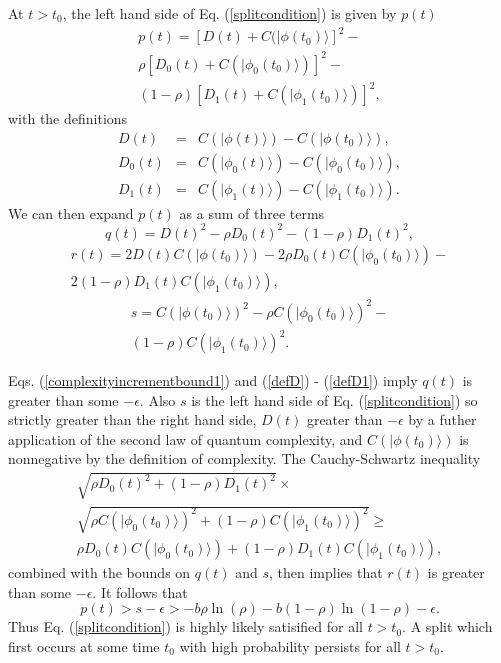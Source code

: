 \documentclass[12pt,amsmath,amssymb,onecolumn]{revtex4-2}
\begin{document}
At  $t > t_0$, the left hand side of Eq. (\ref{splitcondition}) is given
by $p(t)$
\begin{multline}
  \label{lefthand}
  p(t) = [ D( t) + C(|\phi( t_0) \rangle ] ^2 - \\
  \rho [D_0( t) + C( |\phi_0(t_0) \rangle )]^2 - \\
  (1-\rho) [D_1( t) + C( |\phi_1(t_0) \rangle )]^2,
\end{multline}
with the definitions
\begin{subequations}
  \begin{eqnarray}
    \label{defD}
    D(t) & = &  C( |\phi(t) \rangle ) - C(|\phi(t_0) \rangle ) ,\\
 \label{defD0}
    D_0(t) & = &  C( |\phi_0(t) \rangle ) - C(|\phi_0(t_0) \rangle ) ,\\
 \label{defD1}
    D_1(t) & = &  C( |\phi_1(t) \rangle ) - C(|\phi_1(t_0) \rangle ).
  \end{eqnarray}
\end{subequations}
We can then expand $p(t)$ as a sum of three terms
\begin{equation}
  \label{alpha}
  q( t) = D(t)^2 - \rho D_0(t)^2 - (1 - \rho) D_1(t)^2,
\end{equation}
\begin{multline}
  \label{beta}
  r( t) = 2 D(t)C(|\phi(t_0) \rangle ) - 2\rho D_0(t)C(|\phi_0(t_0) \rangle ) - \\2 (1 - \rho) D_1(t)C(|\phi_1(t_0) \rangle ),
\end{multline}
\begin{multline}
  \label{gamma}
  s = C(|\phi(t_0) \rangle )^2 - \rho C(|\phi_0(t_0) \rangle )^2 - \\(1 - \rho)C(|\phi_1(t_0) \rangle )^2.
\end{multline}

Eqs. (\ref{complexityincrementbound1}) and (\ref{defD}) - (\ref{defD1}) imply $q(t)$ is 
greater than some $-\epsilon$.
Also $s$ is the left hand side of  Eq. (\ref{splitcondition})
so strictly greater than the right hand side, $D(t)$ greater than $-\epsilon$
by a futher application
of the second law of quantum complexity, and $C(|\phi(t_0) \rangle )$ is nonnegative by the definition of
complexity.
The Cauchy-Schwartz inequality 
\begin{multline}
  \label{cauchyschwartz}
  \sqrt{\rho D_0(t)^2 + (1 - \rho) D_1(t)^2} \times \\
  \sqrt{\rho C(|\phi_0(t_0) \rangle )^2 + (1 - \rho)C(|\phi_1(t_0) \rangle )^2} \ge \\  
\rho D_0(t)C(|\phi_0(t_0) \rangle ) + (1 - \rho) D_1(t)C(|\phi_1(t_0) \rangle ),
\end{multline}
combined with the bounds on $q(t)$ and $s$, then implies that
$r(t)$ is greater than some $-\epsilon$. It follows that
\begin{equation}
  \label{branchingt}
  p(t) > s - \epsilon >
  -b \rho \ln( \rho) - b ( 1 - \rho) \ln( 1 - \rho) - \epsilon.
\end{equation}
Thus Eq. (\ref{splitcondition}) is highly likely satisified for all $t > t_0$.
A split which first occurs at some time $t_0$ with
high probability persists
for all $t > t_0$.
\end{document}
